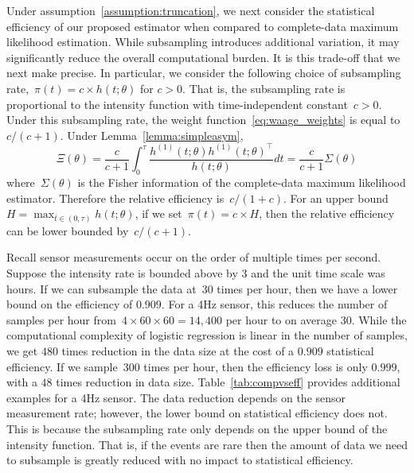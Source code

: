 \documentclass[11pt]{amsart}
\begin{document}
Under assumption~\ref{assumption:truncation}, we next consider the statistical efficiency of our proposed estimator when compared to complete-data maximum likelihood estimation. While subsampling introduces additional variation, it may significantly reduce the overall computational burden. It is this trade-off that we next make precise. In particular, we consider the following choice of subsampling rate,~$\pi(t) = c \times h(t; \theta)$ for $c>0$. That is, the subsampling rate is proportional to the intensity function with time-independent constant~$c > 0$. Under this subsampling rate, the weight function~\eqref{eq:waage_weights} is equal to $c / (c+1)$. Under Lemma~\ref{lemma:simpleasym},
\[
\Xi (\theta) = \frac{c}{c+1} \int_0^\tau \frac{ h^{(1)} (t; \theta)
  h^{(1)} (t; \theta)^\top}{h (t; \theta)} dt = \frac{c}{c+1} \Sigma (\theta)
\]
where~$\Sigma(\theta)$ is the Fisher information of the complete-data maximum likelihood estimator.
Therefore the relative efficiency is~$c/(1+c)$. For an upper bound~$H = \max_{t \in (0,\tau)} h(t;\theta)$, if we set~$\pi (t) = c \times H$, then the relative efficiency can be lower bounded by~$c / (c+1)$.

Recall sensor measurements occur on the order of multiple times per second.  Suppose the intensity rate is bounded above by $3$ and the unit time scale was hours. If we can subsample the data at~$30$ times per hour, then we have a lower bound on the efficiency of $0.909$. For a 4Hz sensor, this reduces the number of samples per hour from~$4 \times 60 \times 60 = 14,400$ per hour to on average $30$. While the computational complexity of logistic regression is linear in the number of samples, we get $480$ times reduction in the data size at the cost of a $0.909$ statistical efficiency. If we sample~$300$ times per hour, then the efficiency loss is only $0.999$, with a $48$ times reduction in data size. Table~\ref{tab:compvseff} provides additional examples for a 4Hz sensor.  The data reduction depends on the sensor measurement rate; however, the lower bound on statistical efficiency does not.  This is because the subsampling rate only depends on the upper bound of the intensity function. That is, if the events are rare then the amount of data we need to subsample is greatly reduced with no impact to statistical efficiency.
\end{document}

